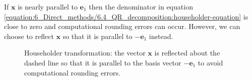 \documentclass[letterpaper,10pt,english]{jupyterBook}
\begin{document}
\sphinxAtStartPar
If \(\mathbf{x}\) is nearly parallel to \(\mathbf{e}_1\) then the denominator in equation \eqref{equation:6_Direct_methods/6.4_QR_decomposition:householder-equation} is close to zero and computational rounding errors can occur. However, we can choose to reflect \(\mathbf{x}\) so that it is parallel to \(-\mathbf{e}_1\) instead.

\begin{figure}[htbp]
\centering
\capstart

\noindent{}
\caption{Householder transformation: the vector \(\mathbf{x}\) is reflected about the dashed line so that it is parallel to the basis vector \(-\mathbf{e}_1\) to avoid computational rounding errors.}\label{\detokenize{6_Direct_methods/6.4_QR_decomposition:householder-2-figure}}\end{figure}
\end{document}
